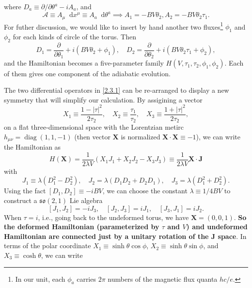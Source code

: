 \documentclass[10pt,nofootinbib,letterpaper]{revtex4}
\newcommand*\dd{\mathop{}\!\mathrm{d}}
\begin{document}
		where $D_a\equiv\partial/\partial\theta^a-iA_a$, and 
		\begin{equation*}
			\mathcal{A}\equiv A_\mu\dd x^\mu\equiv A_a\dd\theta^a\implies A_1=-BV\theta_2, A_2=-BV\theta_2\tau_1.
		\end{equation*}
		For futher discussion, we would like to insert by hand another two fluxes\footnote{In our unit, each $\phi_a$ carries $2\pi$ numbers of the magnetic flux quanta $hc/e$.} $\phi_1$ and $\phi_2$ for each kinds of circle of the torus. Then
		\begin{equation*}
			D_1=\dfrac{\partial }{\partial\theta_1}+i(BV\theta_2+\phi_1),\quad D_2=\dfrac{\partial}{\partial \theta_2}+i(BV\theta_2\tau_1+\phi_2),
		\end{equation*}
		and the Hamiltonian becomes a five-parameter family $H(V,\tau_1,\tau_2,\phi_1,\phi_2)$. Each of them gives one component of the adiabatic evolution.\par
		The two differential operators in \eqref{2.3.1} can be re-arranged to display a new symmetry that will simplify our calculation. By assigining a vector \cite{levay1995berry}
		\begin{equation}\label{2.3.2}
			X_1\equiv\dfrac{1-|\tau|^2}{2\tau_2},\quad X_2\equiv\dfrac{\tau_1}{\tau_2},\quad X_3\equiv\dfrac{1+|\tau|^2}{2\tau_2},
		\end{equation}
		on a flat three-dimensional space with the Lorentzian metirc $h_{\mu\nu}=\mathop{\mathrm{diag}}(1,1,-1)$ (then vector $\bm{X}$ is normalized $\bm{X}\cdot\bm{X}\equiv-1$), we can write the Hamiltonian as
		\begin{equation}\label{2.3.3}
			H(\bm{X})=\dfrac{1}{2\lambda V}(X_1J_1+X_2J_2-X_3J_3)\equiv\dfrac{1}{2\lambda V}\bm{X}\cdot\bm{J}
		\end{equation}
		with
		\begin{equation*}
			J_1\equiv\lambda(D_1^2-D_2^2),\quad J_2=\lambda(D_1D_2+D_2D_1),\quad J_3=\lambda(D_1^2+D_2^2).
		\end{equation*}
		Using the fact $[D_1,D_2]\equiv-iBV$, we can choose the constant $\lambda\equiv1/4BV$ to construct a $\mathfrak{so}(2,1)$ Lie algebra 
		\begin{equation}\label{2.3.4}
			[J_1,J_2]=-iJ_3,\quad[J_2,J_3]=iJ_1,\quad[J_3,J_1]=iJ_2.
		\end{equation}
		When $\tau=i$, i.e., going back to the undeformed torus, we have $\bm{X}=(0,0,1)$. \textbf{So the deformed Hamiltonian (parameterized by $\tau$ and $V$) and undeformed Hamiltonian are connected just by a unitary rotation of the $\bm{J}$ space}. In terms of the polar coordinate $X_1\equiv\sinh\theta\cos\phi$, $X_2\equiv\sinh\theta\sin\phi$, and $X_3\equiv\cosh\theta$, we can write
\end{document}
